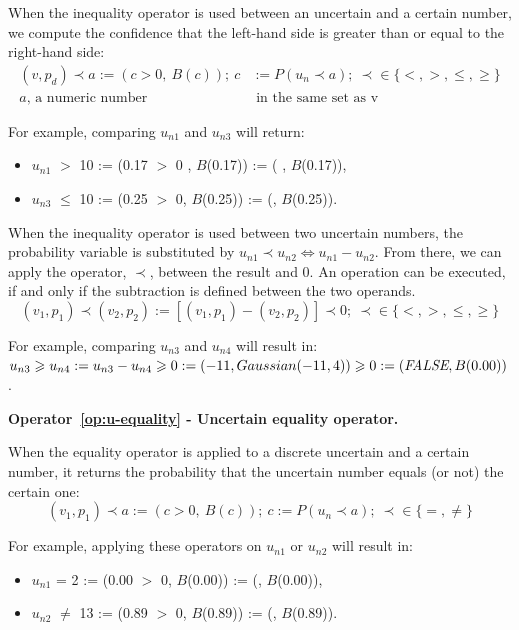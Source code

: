 When the inequality operator is used between an uncertain and a certain number, we compute the confidence that the left-hand side is greater than or equal to the right-hand side:
\begin{align*}
	(v, p_d) \prec a := (c > 0 ,~B(c));~c &:= P(u_n \prec a);~\prec \in \{<,>,\leqslant, \geqslant\}\\
	a \text{, a numeric number}& \text{ in the same set as v}
\end{align*}

For example, comparing $u_{n1}$ and $u_{n3}$ will return:
\begin{itemize}
	\item $u_{n1}$ $>$ 10 := (0.17 $>$ 0 , $B$(0.17)) := (\true{} , $B$(0.17)),
	\item $u_{n3}$ $\leqslant$ 10 := (0.25 $>$ 0, $B$(0.25)) := (\true{}, $B$(0.25)).
\end{itemize}

When the inequality operator is used between two uncertain numbers, the probability variable is substituted by $ u_{n1} \prec u_{n2} \Leftrightarrow u_{n1} - u_{n2}$. 
From there, we can apply the operator, $\prec$, between the result and 0.
An operation can be executed, if and only if the subtraction is defined between the two operands.
\[(v_1, p_1) \prec (v_2, p_2) := [(v_1, p_1) - (v_2, p_2)] \prec 0;~\prec \in \{<,>,\leqslant, \geqslant\}\]

For example, comparing $u_{n3}$ and $u_{n4}$ will result in: $u_{n3} \geqslant u_{n4} := u_{n3} - u_{n4} \geqslant 0 := (-11, Gaussian(-11, 4)) \geqslant 0 := (\textit{FALSE}{}, B(0.00))$.

\bigskip

\noindent\textbf{Operator~\ref{op:u-equality} - Uncertain equality operator.~}

When the equality operator is applied to a discrete uncertain and a certain number, it returns the probability that the uncertain number equals (or not) the certain one:
\[(v_1, p_1) \prec a := (c > 0 ,~B(c));~c := P(u_n \prec a);~\prec \in \{=, \ne\}\]

For example, applying these operators on $u_{n1}$ or $u_{n2}$ will result in:
\begin{itemize}
	\item $u_{n1}$ = 2 := (0.00 $>$ 0, $B$(0.00)) := (\false{}, $B$(0.00)),
	\item $u_{n2}$ $\ne$ 13 :=  (0.89 $>$ 0, $B$(0.89)) := (\true{}, $B$(0.89)).
\end{itemize}

